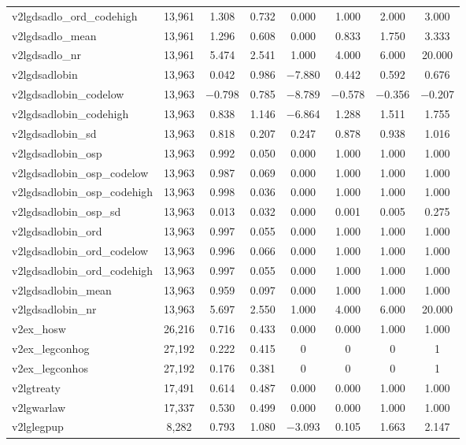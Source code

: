 \begin{table}[!htbp]
\begin{tabular}{@{\extracolsep{5pt}}lccccccc}
v2lgdsadlo\_ord\_codehigh & 13,961 & 1.308 & 0.732 & 0.000 & 1.000 & 2.000 & 3.000 \\ 
v2lgdsadlo\_mean & 13,961 & 1.296 & 0.608 & 0.000 & 0.833 & 1.750 & 3.333 \\ 
v2lgdsadlo\_nr & 13,961 & 5.474 & 2.541 & 1.000 & 4.000 & 6.000 & 20.000 \\ 
v2lgdsadlobin & 13,963 & 0.042 & 0.986 & $-$7.880 & 0.442 & 0.592 & 0.676 \\ 
v2lgdsadlobin\_codelow & 13,963 & $-$0.798 & 0.785 & $-$8.789 & $-$0.578 & $-$0.356 & $-$0.207 \\ 
v2lgdsadlobin\_codehigh & 13,963 & 0.838 & 1.146 & $-$6.864 & 1.288 & 1.511 & 1.755 \\ 
v2lgdsadlobin\_sd & 13,963 & 0.818 & 0.207 & 0.247 & 0.878 & 0.938 & 1.016 \\ 
v2lgdsadlobin\_osp & 13,963 & 0.992 & 0.050 & 0.000 & 1.000 & 1.000 & 1.000 \\ 
v2lgdsadlobin\_osp\_codelow & 13,963 & 0.987 & 0.069 & 0.000 & 1.000 & 1.000 & 1.000 \\ 
v2lgdsadlobin\_osp\_codehigh & 13,963 & 0.998 & 0.036 & 0.000 & 1.000 & 1.000 & 1.000 \\ 
v2lgdsadlobin\_osp\_sd & 13,963 & 0.013 & 0.032 & 0.000 & 0.001 & 0.005 & 0.275 \\ 
v2lgdsadlobin\_ord & 13,963 & 0.997 & 0.055 & 0.000 & 1.000 & 1.000 & 1.000 \\ 
v2lgdsadlobin\_ord\_codelow & 13,963 & 0.996 & 0.066 & 0.000 & 1.000 & 1.000 & 1.000 \\ 
v2lgdsadlobin\_ord\_codehigh & 13,963 & 0.997 & 0.055 & 0.000 & 1.000 & 1.000 & 1.000 \\ 
v2lgdsadlobin\_mean & 13,963 & 0.959 & 0.097 & 0.000 & 1.000 & 1.000 & 1.000 \\ 
v2lgdsadlobin\_nr & 13,963 & 5.697 & 2.550 & 1.000 & 4.000 & 6.000 & 20.000 \\ 
v2ex\_hosw & 26,216 & 0.716 & 0.433 & 0.000 & 0.000 & 1.000 & 1.000 \\ 
v2ex\_legconhog & 27,192 & 0.222 & 0.415 & 0 & 0 & 0 & 1 \\ 
v2ex\_legconhos & 27,192 & 0.176 & 0.381 & 0 & 0 & 0 & 1 \\ 
v2lgtreaty & 17,491 & 0.614 & 0.487 & 0.000 & 0.000 & 1.000 & 1.000 \\ 
v2lgwarlaw & 17,337 & 0.530 & 0.499 & 0.000 & 0.000 & 1.000 & 1.000 \\ 
v2lglegpup & 8,282 & 0.793 & 1.080 & $-$3.093 & 0.105 & 1.663 & 2.147 \\ 

\end{tabular}
\end{table}

